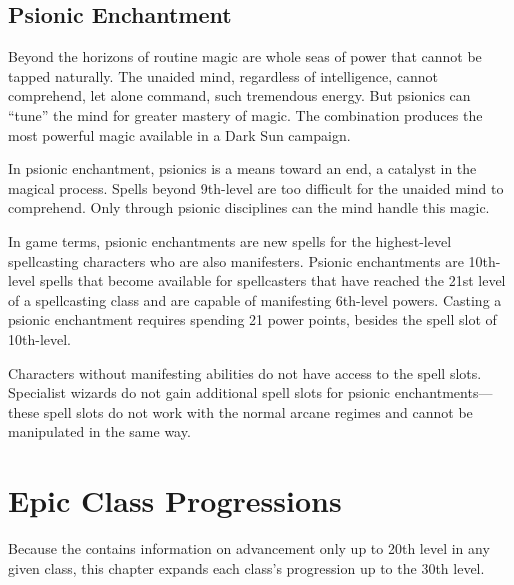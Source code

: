 

\subsection{Psionic Enchantment}
Beyond the horizons of routine magic are whole seas of power that cannot be tapped naturally. The unaided mind, regardless of intelligence, cannot comprehend, let alone command, such tremendous energy. But psionics can ``tune'' the mind for greater mastery of magic. The combination produces the most powerful magic available in a {\tableheader Dark Sun} campaign.

In psionic enchantment, psionics is a means toward an end, a catalyst in the magical process. Spells beyond 9th-level are too difficult for the unaided mind to comprehend. Only through psionic disciplines can the mind handle this magic.

In game terms, psionic enchantments are new spells for the highest-level spellcasting characters who are also manifesters. Psionic enchantments are 10th-level spells that become available for spellcasters that have reached the 21st level of a spellcasting class and are capable of manifesting 6th-level powers. Casting a psionic enchantment requires spending 21 power points, besides the spell slot of 10th-level.

Characters without manifesting abilities do not have access to the spell slots. Specialist wizards do not gain additional spell slots for psionic enchantments---these spell slots do not work with the normal arcane regimes and cannot be manipulated in the same way.

\section{Epic Class Progressions}
Because the  contains information on advancement only up to 20th level in any given class, this chapter expands each class's progression up to the 30th level.




